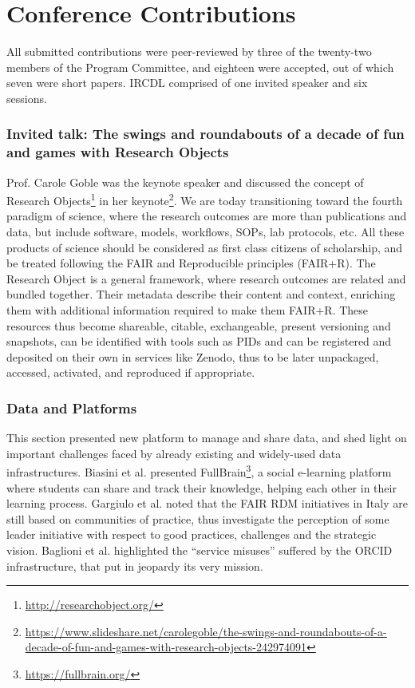 \documentclass{sig-alternate-10pt}
\begin{document}
\section{Conference Contributions}
All submitted contributions were peer-reviewed by three of the twenty-two members of the Program Committee, and eighteen were accepted, out of which seven were short papers. IRCDL comprised of one invited speaker and six sessions.

\subsubsection*{Invited talk: The swings and roundabouts of a decade of fun and games with Research Objects} Prof. Carole Goble was the keynote speaker and discussed the concept of Research Objects\footnote{\url{http://researchobject.org/}}\cite{bechhofer2013linked} in her keynote\footnote{\url{https://www.slideshare.net/carolegoble/the-swings-and-roundabouts-of-a-decade-of-fun-and-games-with-research-objects-242974091}}. We are today transitioning toward the fourth paradigm of science, where the research outcomes are more than publications and data, but include software, models, workflows, SOPs, lab protocols, etc. All these products of science should be considered as first class citizens of scholarship, and be treated following the FAIR and Reproducible principles (FAIR+R). 
The Research Object is a general framework, where research outcomes are related and bundled together. Their metadata describe their content and context, enriching them with additional information required to make them FAIR+R. These resources thus become shareable, citable, exchangeable, present versioning and snapshots, can be identified with tools such as PIDs and can be registered and deposited on their own in services like Zenodo, thus to be later unpackaged, accessed, activated, and reproduced if appropriate. 

\subsubsection*{Data and Platforms}
This section presented new platform to manage and share data, and shed light on important challenges faced by already existing and widely-used data infrastructures.
Biasini et al. \cite{biasini2021fullbrain} presented FullBrain\footnote{\url{https://fullbrain.org/}}, a social e-learning platform where students can share and track their knowledge, helping each other in their learning process.
Gargiulo et al. \cite{GargiuloGTZ21} noted that the FAIR RDM initiatives in Italy are still based on communities of practice, thus investigate the perception of some leader initiative with respect to good practices, challenges and the strategic vision. 
Baglioni et al. \cite{BaglioniMMABB21} highlighted the ``service misuses'' suffered by the ORCID infrastructure, that put in jeopardy its very mission.
\end{document}
